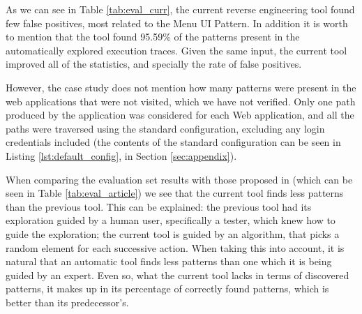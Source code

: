 As we can see in Table \ref{tab:eval_curr}, the current reverse engineering tool found few false positives, most related to the Menu UI Pattern. In addition it is worth to mention that the tool found 95.59\% of the  patterns present in the automatically explored execution traces. Given the same input, the current tool improved all of the statistics, and specially the rate of false positives.

However, the case study does not mention how many patterns were present in the web applications that were not visited, which we have not verified. Only one path produced by the application was considered for each Web application, and all the paths were traversed using the standard configuration, excluding any login credentials included (the contents of the standard configuration can be seen in Listing \ref{lst:default_config}, in Section \ref{sec:appendix}).

\begin{table}[!htb]
\centering
{}
\caption{Evaluation set results from the previous tool, taken from \cite{nabuco2014inferring}.}
\label{tab:eval_article}
\end{table}

When comparing the evaluation set results with those proposed in \cite{nabuco2014inferring} (which can be seen in Table \ref{tab:eval_article}) we see that the current tool finds less patterns than the previous tool. This can be explained: the previous tool had its exploration guided by a human user, specifically a tester, which knew how to guide the exploration; the current tool is guided by an algorithm, that picks a random element for each successive action. When taking this into account, it is natural that an automatic tool finds less patterns than one which it is being guided by an expert. Even so, what the current tool lacks in terms of discovered patterns, it makes up in its percentage of correctly found patterns, which is better than its predecessor's. 

